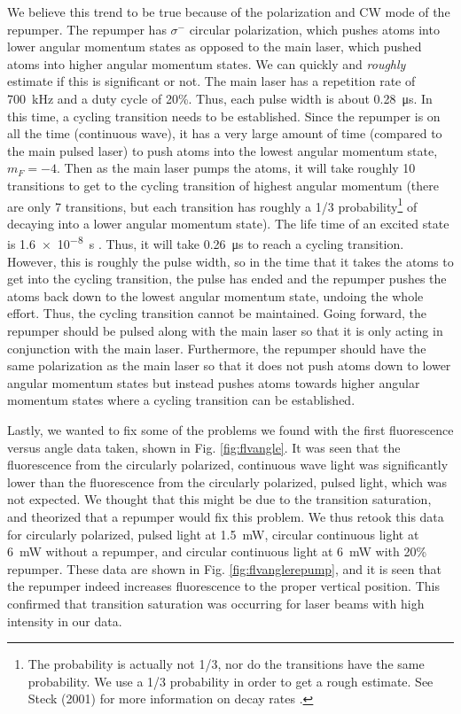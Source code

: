 We believe this trend to be true because of the polarization and CW mode of the repumper. The repumper has $\sigma^{-}$ circular polarization, which pushes atoms into lower angular momentum states as opposed to the main laser, which pushed atoms into higher angular momentum states. We can quickly and \textit{roughly} estimate if this is significant or not. The main laser has a repetition rate of \SI{700}{\kilo Hz} and a duty cycle of 20\%. Thus, each pulse width is about \SI{0.28}{\micro \second}. In this time, a cycling transition needs to be established. Since the  repumper is on all the time (continuous wave), it has a very large amount of time (compared to the main pulsed laser) to push atoms into the lowest angular momentum state, $m_F = -4$. Then as the main laser pumps the atoms, it will take roughly 10 transitions to get to the cycling transition of highest angular momentum (there are only 7 transitions, but each transition has roughly a 1/3 probability\footnote{The probability is actually not 1/3, nor do the transitions have the same probability. We use a 1/3 probability in order to get a rough estimate. See Steck (2001) for more information on decay rates \cite{steck}.} of decaying into a lower angular momentum state). The life time of an excited state is \SI{1.6e-8}{\second} \cite{steck}. Thus, it will take \SI{0.26}{\micro \second} to reach a cycling transition. However, this is roughly the pulse width, so in the time that it takes the atoms to get into the cycling transition, the pulse has ended and the repumper pushes the atoms back down to the lowest angular momentum state, undoing the whole effort. Thus, the cycling transition cannot be maintained. Going forward, the repumper should be pulsed along with the main laser so that it is only acting in conjunction with the main laser. Furthermore, the repumper should have the same polarization as the main laser so that it does not push atoms down to lower angular momentum states but instead pushes atoms towards higher angular momentum states where a cycling transition can be established.

Lastly, we wanted to fix some of the problems we found with the first fluorescence versus angle data taken, shown in Fig. \ref{fig:flvangle}. It was seen that the fluorescence from the circularly polarized, continuous wave light was significantly lower than the fluorescence from the circularly polarized, pulsed light, which was not expected. We thought that this might be due to the transition saturation, and theorized that a repumper would fix this problem. We thus retook this data for circularly polarized, pulsed light at \SI{1.5}{\milli W}, circular continuous light at \SI{6}{\milli \watt} without a repumper, and circular continuous light at \SI{6}{\milli W} with 20\% repumper. These data are shown in Fig. \ref{fig:flvanglerepump}, and it is seen that the repumper indeed increases fluorescence to the proper vertical position. This confirmed that transition saturation was occurring for laser beams with high intensity in our data.

